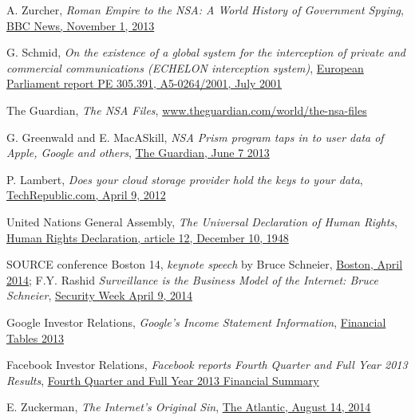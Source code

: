 \documentclass[twocolumn,english]{article}
\begin{document}
\begin{thebibliography}{9}
 A. Zurcher, \emph{Roman Empire to the NSA: A World History of Government Spying}, \href{http://www.bbc.co.uk/news/magazine-24749166}{BBC News, November 1, 2013}

 G. Schmid, \emph{On the existence of a global system for the interception of private and commercial communications (ECHELON interception system)}, \href{http://www.europarl.europa.eu/sides/getDoc.do?pubRef=-//EP//TEXT+REPORT+A5-2001-0264+0+DOC+XML+V0//EN}{European Parliament report PE 305.391, A5-0264/2001, July 2001}

 The Guardian, \emph{The NSA Files}, \href{http://www.theguardian.com/world/the-nsa-files}{www.theguardian.com/world/the-nsa-files}

 G. Greenwald and E. MacASkill, \emph{NSA Prism program taps in to user data of Apple, Google and others}, \href{http://www.theguardian.com/world/2013/jun/06/us-tech-giants-nsa-data}{The Guardian, June 7 2013}

 P. Lambert, \emph{Does your cloud storage provider hold the keys to your data}, \href{http://www.techrepublic.com/blog/it-security/does-your-cloud-storage-provider-hold-the-keys-to-your-data}{TechRepublic.com, April 9, 2012}

 United Nations General Assembly, \emph{The Universal Declaration of Human Rights}, \href{http://www.un.org/en/documents/udhr/}{Human Rights Declaration, article 12, December 10, 1948}

 SOURCE conference Boston 14, \emph{keynote speech} by Bruce Schneier, \href{http://sourceconference.com/boston/}{Boston, April 2014}; F.Y. Rashid \emph{Surveillance is the Business Model of the Internet: Bruce Schneier}, \href{http://www.securityweek.com/surveillance-business-model-internet-bruce-schneier}{Security Week April 9, 2014}

 Google Investor Relations, \emph{Google's Income Statement Information}, \href{https://investor.google.com/financial/2013/tables.html}{Financial Tables 2013}

 Facebook Investor Relations, \emph{Facebook reports Fourth Quarter and Full Year 2013 Results}, \href{http://investor.fb.com/releasedetail.cfm?ReleaseID=821954}{Fourth Quarter and Full Year 2013 Financial Summary}

 E. Zuckerman, \emph{The Internet's Original Sin}, \href{http://www.theatlantic.com/technology/archive/2014/08/advertising-is-the-internets-original-sin/376041/}{The Atlantic, August 14, 2014}


\end{thebibliography}
\end{document}
